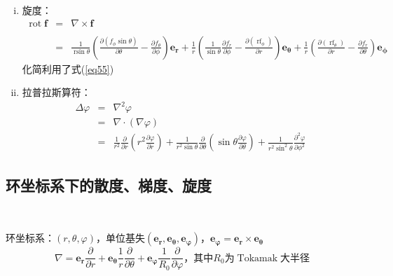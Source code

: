\documentclass[UTF8]{ctexart}
\newcommand{\tmmathbf}[1]{\ensuremath{\boldsymbol{#1}}}
\newcommand{\tmop}[1]{\ensuremath{\operatorname{#1}}}
\newenvironment{enumerateroman}{\begin{enumerate}[i.] }{\end{enumerate}}
\begin{document}
\begin{enumerateroman}
  \item 旋度：
  \begin{eqnarray}
    \tmop{rot} \tmmathbf{f} & = & \nabla \times \tmmathbf{f} \nonumber\\
    \nonumber\\
    & = & \frac{1}{\tmop{rsin} \theta} \left( \frac{\partial (f_{\phi} \sin
    \theta)}{\partial \theta} - \frac{\partial f_{\theta}}{\partial \phi}
    \right) \tmmathbf{e_r} + \frac{1}{r} \left( \frac{1}{\sin \theta}
    \frac{\partial f_r}{\partial \phi} - \frac{\partial
    (\tmop{rf}_{\phi})}{\partial r} \right) \tmmathbf{e_{\theta}} +
    \frac{1}{r} \left( \frac{\partial (\tmop{rf}_{\theta})}{\partial r} -
    \frac{\partial f_r}{\partial \theta} \right) \tmmathbf{e_{\phi}} 
  \end{eqnarray}
  化简利用了式(\ref{eq55})
  
  \item 拉普拉斯算符：
  \begin{eqnarray}
    \Delta \varphi & = & \nabla^2 \varphi \nonumber\\
    & = & \nabla \cdot (\nabla \varphi) \nonumber\\
    & = & \frac{1}{r^2} \frac{\partial}{\partial r} \left( r^2 \frac{\partial
    \varphi}{\partial r} \right) + \frac{1}{r^2 \sin \theta}
    \frac{\partial}{\partial \theta} \left( \sin \theta \frac{\partial
    \varphi}{\partial \theta} \right) + \frac{1}{r^2 \sin^2 \theta}
    \frac{\partial^2 \varphi}{\partial \phi^2} 
  \end{eqnarray}
\end{enumerateroman}

\subsection{环坐标系下的散度、梯度、旋度}

\

环坐标系：$(r, \theta, \varphi) ，单位基失 (\tmmathbf{e_r},
\tmmathbf{e_{\theta}}, \tmmathbf{e_{\varphi}})$，$\tmmathbf{e_{\varphi}} =
\tmmathbf{e_r } \times \tmmathbf{e_{\theta}}$
\begin{equation}
  \nabla = \tmmathbf{e_r} \frac{\partial}{\partial r} + \tmmathbf{e_{\theta}}
  \frac{1}{r} \frac{\partial}{\partial \theta} + \tmmathbf{e_{\varphi}}
  \frac{1}{R_0} \frac{\partial}{\partial \varphi} ，其中R_0 为
  \tmop{Tokamak} 大半径
\end{equation}
\end{document}
